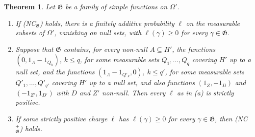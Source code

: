 \documentclass[11pt]{article}
\newtheorem{theorem}{Theorem}
\theoremstyle{definition}\newtheorem{definition}[theorem]{Definition}
\theoremstyle{remark}\newtheorem{remark}[theorem]{Remark}
\begin{document}
\begin{theorem}\label{thm:NC}
Let $\mathfrak G$ be a family of simple functions on $\Omega'$.
\begin{enumerate}[label=(\alph*),leftmargin=*,itemsep=2pt]
\item If (NC$_{\mathfrak G}$) holds, there is a finitely additive
probability $\ell$ on the measurable subsets of $\Omega'$, vanishing on null
sets, with $\ell(\gamma)\ge0$ for every $\gamma\in\mathfrak G$.
\item Suppose that $\mathfrak G$ contains, for every non-null $A\subseteq
H'$, the functions $(0,1_A-1_{Q_k})$, $k\le q$, for some measurable sets
$Q_1,\dots,Q_q$ covering $H'$ up to a null set, and the functions
$(1_A-1_{Q'_k},0)$, $k\le q'$, for some measurable sets
$Q'_1,\dots,Q'_{q'}$ covering $H'$ up to a null set, and
also functions $(1_Z,-1_D)$ and $(-1_{Z'},1_{D'})$ with $D$ and $Z'$
non-null. Then every $\ell$ as in (a) is strictly positive.
\item If some strictly positive charge $\ell$ has $\ell(\gamma)\ge0$ for
every $\gamma\in\mathfrak G$, then (NC$^+_{\mathfrak G}$) holds.
\end{enumerate}
\end{theorem}
\end{document}
